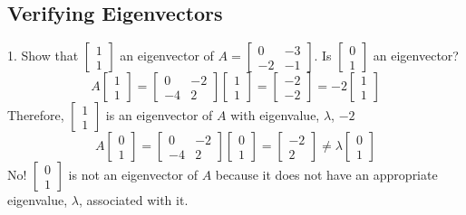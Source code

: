 \begin{enumerate}
\subsection{Verifying Eigenvectors}
1. Show that $\begin{bmatrix}1 \\ 1 \end{bmatrix}$ an eigenvector of $A = 
  \begin{bmatrix} 0 & -3 \\ -2 & -1 \end{bmatrix}$. Is $\begin{bmatrix}
0 \\ 1 \end{bmatrix}$ an eigenvector? 
\[
  A\begin{bmatrix} 1 \\ 1 \end{bmatrix} = \begin{bmatrix} 0 & -2 
  \\ -4 & 2 \end{bmatrix} \begin{bmatrix} 1 \\ 1 \end{bmatrix} = 
  \begin{bmatrix} -2 \\ -2 \end{bmatrix} = -2 \begin{bmatrix} 1 
\\ 1 \end{bmatrix}
\]
Therefore, $\begin{bmatrix} 1 \\ 1 \end{bmatrix}$ is an eigenvector of 
$A$ with eigenvalue, $\lambda$, $-2$ 
\[
  A\begin{bmatrix} 0 \\ 1 \end{bmatrix} = \begin{bmatrix} 0 & -2 \\
  -4 & 2 \end{bmatrix} \begin{bmatrix} 0 \\ 1 \end{bmatrix} = 
  \begin{bmatrix} -2 \\ 2 \end{bmatrix} \neq \lambda \begin{bmatrix}
0 \\ 1 \end{bmatrix}
\]
No! $\begin{bmatrix} 0 \\ 1 \end{bmatrix}$ is not an eigenvector of 
$A$ because it does not have an appropriate eigenvalue, $\lambda$, 
associated with it.

\end{enumerate}
